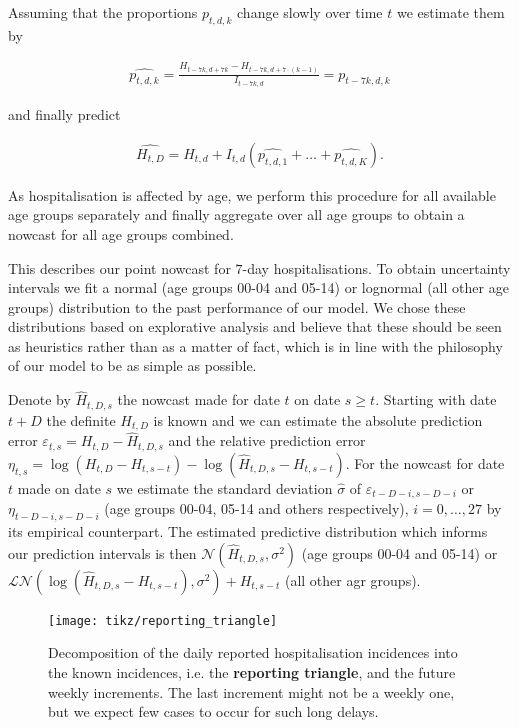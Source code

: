 Assuming that the proportions \(p_{t,d,k}\) change slowly over time
\(t\) we estimate them by

\begin{align}
\label{eq:predict_p_tdk}
\widehat {p_{t,d,k}} = \frac{H_{t - 7k, d + 7k} - H_{t - 7k, d + 7\cdot(k - 1)}}{I_{t - 7k,d}} = p_{t - 7k,d,k}
\end{align}

and finally predict

\begin{align}
\label{eq:predict_H_tD}
\widehat{H_{t,D}} = H_{t,d} + I_{t,d} \left(\widehat{p_{t,d,1}} + \dots + \widehat{p_{t,d,K}}\right).
\end{align}

As hospitalisation is affected by age, we perform this procedure for all
available age groups separately and finally aggregate over all age
groups to obtain a nowcast for all age groups combined.

This describes our point nowcast for \(7\)-day hospitalisations. To
obtain uncertainty intervals we fit a normal (age groups 00-04 and
05-14) or lognormal (all other age groups) distribution to the past
performance of our model. We chose these distributions based on
explorative analysis and believe that these should be seen as heuristics
rather than as a matter of fact, which is in line with the philosophy of
our model to be as simple as possible.

Denote by \(\hat H_{t,D,s}\) the nowcast made for date \(t\) on date
\(s \geq t\). Starting with date \(t + D\) the definite \(H_{t,D}\) is
known and we can estimate the absolute prediction error
\(\varepsilon_{t,s} = H_{t,D} - \hat H_{t,D,s}\) and the relative
prediction error
\(\eta_{t,s} = \log \left( H_{t,D} - H_{t, s - t}\right) - \log \left( \hat H_{t,D,s} - H_{t, s- t} \right)\).
For the nowcast for date \(t\) made on date \(s\) we estimate the
standard deviation \(\hat\sigma\) of
\(\varepsilon_{t - D - i, s - D - i}\) or
\(\eta_{t - D - i, s - D - i}\) (age groups 00-04, 05-14 and others
respectively), \(i = 0, \dots, 27\) by its empirical counterpart. The
estimated predictive distribution which informs our prediction intervals
is then \(\mathcal N (\hat H_{t,D,s}, \sigma^2)\) (age groups 00-04 and
05-14) or
\(\mathcal{LN} \left( \log \left(\hat H_{t,D,s} - H_{t, s - t}\right), \sigma^2 \right) + H_{t, s - t}\)
(all other agr groups).

\begin{figure}
    \centering
    \texttt{[image: tikz/reporting\_triangle]}
    \caption{Decomposition of the daily reported hospitalisation incidences into the {\color{TUIl-orange} known incidences}, i.e. the \textbf{reporting triangle}, and {\color{TUIl-green}the future weekly increments}. {\color{TUIl-blue}The last increment} might not be a weekly one, but we expect few cases to occur for such long delays.}
    \label{fig:reporting_triangle}
\end{figure}

